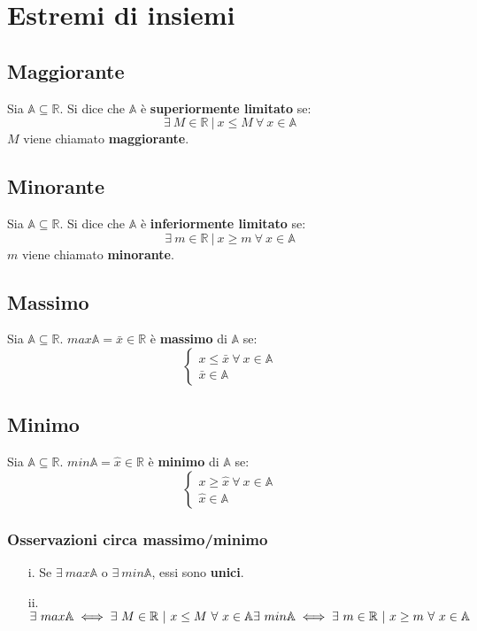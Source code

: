 \chapter{Estremi di insiemi}
\label{sec: estremiInsiemi}
\section{Maggiorante}
Sia $\mathbb{A} \subseteq \mathbb{R}$. Si dice che $\mathbb{A}$ è \textbf{superiormente limitato} se:
\begin{equation}
\exists\ M \in \mathbb{R}\ |\ x \leq M\ \forall\ x \in \mathbb{A}
\end{equation}
$M$ viene chiamato \textbf{maggiorante}.
\section{Minorante}
Sia $\mathbb{A} \subseteq \mathbb{R}$. Si dice che $\mathbb{A}$ è \textbf{inferiormente limitato} se:
\begin{equation}
\exists\ m \in \mathbb{R}\ |\ x \geq m\ \forall\ x \in \mathbb{A}
\end{equation}
$m$ viene chiamato \textbf{minorante}.
\section{Massimo}
Sia $\mathbb{A} \subseteq \mathbb{R}$. $max\mathbb{A}=\bar{x} \in \mathbb{R}$ è \textbf{massimo} di $\mathbb{A}$ se:
\begin{equation}
\begin{cases}
x \leq \bar{x}\ \forall\ x \in \mathbb{A}\\
\bar{x} \in \mathbb{A}
\end{cases}
\end{equation}
\section{Minimo}
Sia $\mathbb{A} \subseteq \mathbb{R}$. $min\mathbb{A}=\hat{x} \in \mathbb{R}$ è \textbf{minimo} di $\mathbb{A}$ se:
\begin{equation}
\begin{cases}
x \geq \hat{x}\ \forall\ x \in \mathbb{A}\\
\hat{x} \in \mathbb{A}
\end{cases}
\end{equation}
\subsection{Osservazioni circa massimo/minimo}
\begin{enumerate}
\item [i.] Se $\exists\ max\mathbb{A}$ o $\exists\ min\mathbb{A}$, essi sono \textbf{unici}.
\item [ii.] $\exists\ max\mathbb{A} \iff \exists\ M \in \mathbb{R}\ |\ x \leq M\ \forall\ x \in \mathbb{A}\\
\exists\ min\mathbb{A} \iff \exists\ m \in \mathbb{R}\ |\ x \geq m\ \forall\ x \in \mathbb{A}$
\end{enumerate}
